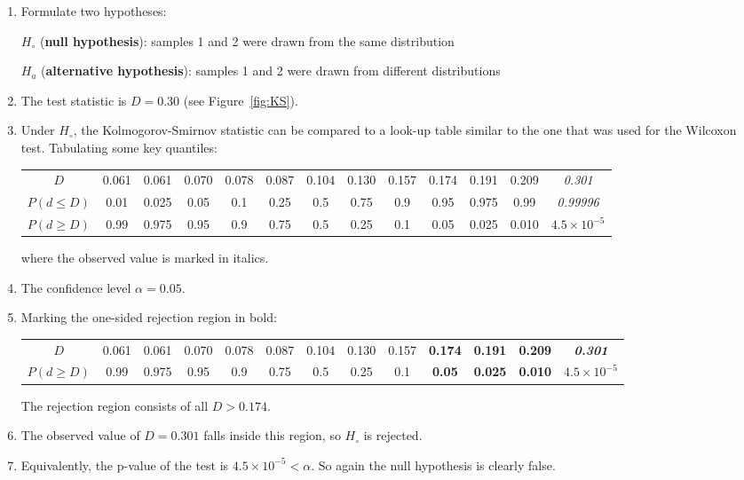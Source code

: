 \begin{enumerate}
\item  Formulate two hypotheses:

  $H_\circ$ (\textbf{null hypothesis}):
  samples 1 and 2 were drawn from the same distribution

  $H_a$ (\textbf{alternative hypothesis}):
  samples 1 and 2 were drawn from different distributions
  
\item The test statistic is $D=0.30$ (see Figure~\ref{fig:KS}).

\item Under $H_\circ$, the Kolmogorov-Smirnov statistic can be
  compared to a look-up table similar to the one that was used for the
  Wilcoxon test. Tabulating some key quantiles:
  \begin{center}
    \begin{tabular}{c|c@{\gap}c@{\gap}c@{\gap}c@{\gap}
        c@{\gap}c@{\gap}c@{\gap}c@{\gap}c@{\gap}c@{\gap}c@{\gap}c}
      $D$ & 0.061 & 0.061 & 0.070 & 0.078 & 0.087 & 0.104 &
      0.130 & 0.157 & 0.174 & 0.191 & 0.209 & \emph{0.301}\\
      $P(d\leq{D})$ & 0.01 & 0.025 & 0.05 & 0.1 & 0.25 &
      0.5 & 0.75 & 0.9 & 0.95 & 0.975 & 0.99 & \emph{0.99996}\\
      $P(d\geq{D})$ & 0.99 & 0.975 & 0.95 & 0.9 & 0.75 & 0.5 &
      0.25 & 0.1 & 0.05 & 0.025 & 0.010 & $\mathit{4.5\times{10}^{-5}}$
    \end{tabular}
  \end{center}

  \noindent where the observed value is marked in italics.
  
\item The confidence level $\alpha = 0.05$.

\item Marking the one-sided rejection region in bold:
  \begin{center}
    \begin{tabular}{c|c@{\gap}c@{\gap}c@{\gap}c@{\gap}
        c@{\gap}c@{\gap}c@{\gap}c@{\gap}c@{\gap}c@{\gap}c@{\gap}c}
      $D$ & 0.061 & 0.061 & 0.070 & 0.078 & 0.087 & 0.104 &
      0.130 & 0.157 & \textbf{0.174} & \textbf{0.191} &
      \textbf{0.209} & \textbf{\emph{0.301}}\\
      $P(d\geq{D})$ & 0.99 & 0.975 & 0.95 & 0.9 & 0.75 & 0.5 &
      0.25 & 0.1 & \textbf{0.05} & \textbf{0.025} & \textbf{0.010} &
      $\boldsymbol{\mathit{4.5\times{10}^{-5}}}$
    \end{tabular}
  \end{center}

  The rejection region consists of all $D>{0.174}$.

\item The observed value of $D=0.301$ falls inside this region, so
  $H_\circ$ is rejected.

\item Equivalently, the p-value of the test is
  $4.5\times{10}^{-5}<\alpha$.  So again the null hypothesis is
  clearly false.
  
\end{enumerate}

